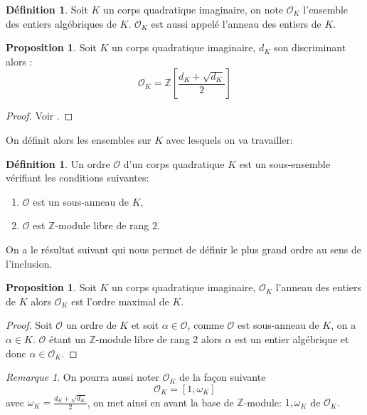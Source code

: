 \documentclass[10pt,a4paper]{book}
\theoremstyle{plain}
\theoremstyle{definition}
\theoremstyle{definition}
\theoremstyle{definition}
\newtheorem{prop}[thm]{Proposition}
\theoremstyle{definition}
\newtheorem{defi}[thm]{Définition}
\theoremstyle{remark}
\newtheorem{rem}[thm]{Remarque}
\theoremstyle{remark}
\begin{document}
\begin{defi}
Soit $K$ un corps quadratique imaginaire, on note $\mathcal{O}_K$ l'ensemble des entiers algébriques de $K$. $\mathcal{O}_K$ est aussi appelé l'anneau des entiers de $K$.
\end{defi}

\begin{prop}
Soit $K$ un corps quadratique imaginaire, $d_K$ son discriminant alors : 
\[ \mathcal{O}_K=\mathbb{Z} \left[ \frac{d_K+\sqrt{d_K}}{2} \right]  \]  
\end{prop}

\begin{proof}
Voir \cite[exercise 5.7]{Cox89}.
\end{proof}

On définit alors les ensembles sur $K$  avec lesquels on va travailler:

\begin{defi}
Un ordre $\mathcal{O}$ d'un corps quadratique $K$ est un sous-ensemble vérifiant les conditions suivantes: 
\begin{enumerate}
\item $\mathcal{O}$ est un sous-anneau de $K$,
\item $\mathcal{O}$ est $\mathbb{Z}$-module libre de rang $2$.
\end{enumerate} 
\end{defi}

On a le résultat suivant qui nous permet de définir le plus grand ordre au sens de l'inclusion.

\begin{prop}
Soit $K$ un corps quadratique imaginaire, $\mathcal{O}_K$ l'anneau des entiers de $K$ alors $\mathcal{O}_K$ est l'ordre maximal de $K$.
\end{prop}

\begin{proof}
Soit $\mathcal{O}$ un ordre de $K$ et soit $\alpha \in \mathcal{O}$, comme $\mathcal{O}$ est sous-anneau de $K$, on a $\alpha \in K$. $\mathcal{O}$ étant un $\mathbb{Z}$-module libre de rang 2 alors $\alpha$ est un entier algébrique et donc $\alpha \in \mathcal{O}_K$.
\end{proof}


\begin{rem}
On pourra aussi noter $\mathcal{O}_K$ de la façon suivante 
\[ \mathcal{O}_K =[1, \omega_K] \]
avec $\omega_K = \frac{d_K+\sqrt{d_K}}{2} $, on met ainsi en avant la base de $\mathbb{Z}$-module: $1, \omega_K$ de $\mathcal{O}_K$.
\end{rem}
\end{document}
